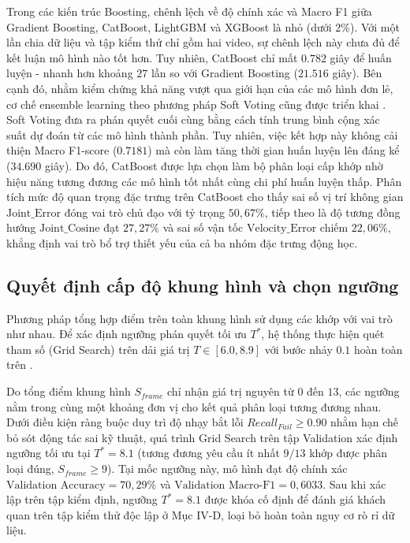 \documentclass[10pt,conference,a4paper]{IEEEtran}
\begin{document}
Trong các kiến trúc Boosting, chênh lệch về độ chính xác và Macro F1 giữa Gradient Boosting, CatBoost, LightGBM và XGBoost là nhỏ (dưới $2\%$). Với một lần chia dữ liệu và tập kiểm thử chỉ gồm hai video, sự chênh lệch này chưa đủ để kết luận mô hình nào tốt hơn. Tuy nhiên, CatBoost \cite{prokhorenkova2018catboost} chỉ mất $0.782$ giây để huấn luyện - nhanh hơn khoảng $27$ lần so với Gradient Boosting ($21.516$ giây). Bên cạnh đó, nhằm kiểm chứng khả năng vượt qua giới hạn của các mô hình đơn lẻ, cơ chế ensemble learning theo phương pháp Soft Voting cũng được triển khai \cite{zhou2012ensemble}. Soft Voting đưa ra phán quyết cuối cùng bằng cách tính trung bình cộng xác suất dự đoán từ các mô hình thành phần. Tuy nhiên, việc kết hợp này không cải thiện Macro F1-score ($0.7181$) mà còn làm tăng thời gian huấn luyện lên đáng kể ($34.690$ giây). Do đó, CatBoost được lựa chọn làm bộ phân loại cấp khớp nhờ hiệu năng tương đương các mô hình tốt nhất cùng chi phí huấn luyện thấp. Phân tích mức độ quan trọng đặc trưng trên CatBoost cho thấy sai số vị trí không gian $\text{Joint\_Error}$ đóng vai trò chủ đạo với tỷ trọng $50{,}67\%$, tiếp theo là độ tương đồng hướng $\text{Joint\_Cosine}$ đạt $27{,}27\%$ và sai số vận tốc $\text{Velocity\_Error}$ chiếm $22{,}06\%$, khẳng định vai trò bổ trợ thiết yếu của cả ba nhóm đặc trưng động học.

\subsection{Quyết định cấp độ khung hình và chọn ngưỡng}

Phương pháp tổng hợp điểm trên toàn khung hình sử dụng các khớp với vai trò như nhau. Để xác định ngưỡng phán quyết tối ưu $T^*$, hệ thống thực hiện quét tham số (Grid Search) trên dải giá trị $T \in [6.0, 8.9]$ với bước nhảy $0.1$ hoàn toàn trên .

Do tổng điểm khung hình $S_{frame}$ chỉ nhận giá trị nguyên từ $0$ đến $13$, các ngưỡng nằm trong cùng một khoảng đơn vị cho kết quả phân loại tương đương nhau. Dưới điều kiện ràng buộc duy trì độ nhạy bắt lỗi $Recall_{Fail} \ge 0.90$ nhằm hạn chế bỏ sót động tác sai kỹ thuật, quá trình Grid Search trên tập Validation xác định ngưỡng tối ưu tại $T^* = 8.1$ (tương đương yêu cầu ít nhất $9/13$ khớp được phân loại đúng, $S_{frame} \ge 9$). Tại mốc ngưỡng này, mô hình đạt độ chính xác $\text{Validation Accuracy} = 70{,}29\%$ và $\text{Validation Macro-F1} = 0{,}6033$. Sau khi xác lập trên tập kiểm định, ngưỡng $T^* = 8.1$ được khóa cố định để đánh giá khách quan trên tập kiểm thử độc lập ở Mục IV-D, loại bỏ hoàn toàn nguy cơ rò rỉ dữ liệu.
\end{document}

